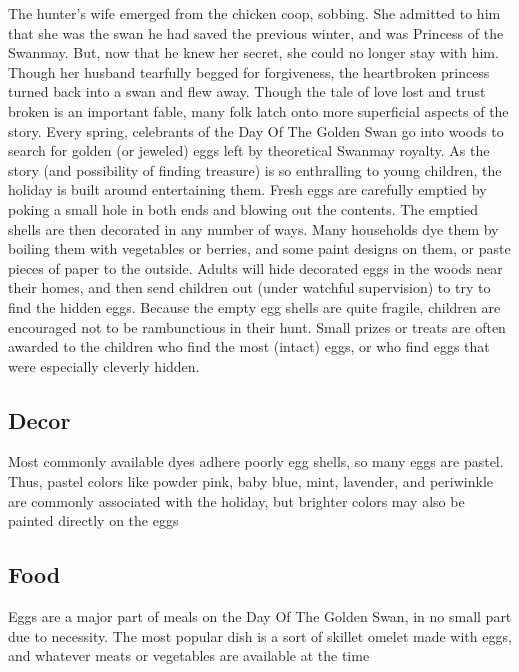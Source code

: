 \documentclass[10pt,a4paper,twoside,twocolumn,openany,bg=print,nodeprecatedcode]{dndbook}
\begin{document}
The hunter's wife emerged from the chicken coop, sobbing. She admitted to him that she was the swan he had saved the previous winter, and was Princess of the Swanmay. But, now that he knew her secret, she could no longer stay with him. Though her husband tearfully begged for forgiveness, the heartbroken princess turned back into a swan and flew away. Though the tale of love lost and trust broken is an important fable, many folk latch onto more superficial aspects of the story. Every spring, celebrants of the Day Of The Golden Swan go into woods to search for golden (or jeweled) eggs left by theoretical Swanmay royalty. As the story (and possibility of finding treasure) is so enthralling to young children, the holiday is built around entertaining them. Fresh eggs are carefully emptied by poking a small hole in both ends and blowing out the contents. The emptied shells are then decorated in any number of ways. Many households dye them by boiling them with vegetables or berries, and some paint designs on them, or paste pieces of paper to the outside. Adults will hide decorated eggs in the woods near their homes, and then send children out (under watchful supervision) to try to find the hidden eggs. Because the empty egg shells are quite fragile, children are encouraged not to be rambunctious in their hunt. Small prizes or treats are often awarded to the children who find the most (intact) eggs, or who find eggs that were especially cleverly hidden.
\subsection{Decor}
Most commonly available dyes adhere poorly egg shells, so many eggs are pastel. Thus, pastel colors like powder pink, baby blue, mint, lavender, and periwinkle are commonly associated with the holiday, but brighter colors may also be painted directly on the eggs
\subsection{Food}
Eggs are a major part of meals on the Day Of The Golden Swan, in no small part due to necessity. The most popular dish is a sort of skillet omelet made with eggs, and whatever meats or vegetables are available at the time
\end{document}
